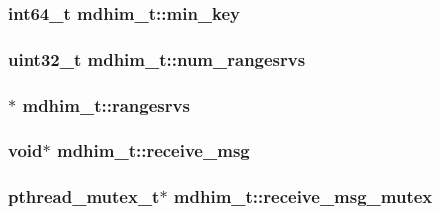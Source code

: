 \hypertarget{structmdhim__t_af005677e9912642ebe431f5037824d97}{
\subsubsection[{min\-\_\-key}]{\setlength{\rightskip}{0pt plus 5cm}int64\-\_\-t mdhim\-\_\-t\-::min\-\_\-key}}\label{d8/dbc/structmdhim__t_af005677e9912642ebe431f5037824d97}
\hypertarget{structmdhim__t_a41b224b41799585edf8a8b2b2f4626cc}{
\subsubsection[{num\-\_\-rangesrvs}]{\setlength{\rightskip}{0pt plus 5cm}uint32\-\_\-t mdhim\-\_\-t\-::num\-\_\-rangesrvs}}\label{d8/dbc/structmdhim__t_a41b224b41799585edf8a8b2b2f4626cc}
\hypertarget{structmdhim__t_ae05a450ac4f312ae4bdb9c1ea52e53e0}{
\subsubsection[{rangesrvs}]{$\ast$ mdhim\-\_\-t\-::rangesrvs}}\label{d8/dbc/structmdhim__t_ae05a450ac4f312ae4bdb9c1ea52e53e0}
\hypertarget{structmdhim__t_abc3233b7d61111d19bb7ac0222a918fc}{
\subsubsection[{receive\-\_\-msg}]{\setlength{\rightskip}{0pt plus 5cm}void$\ast$ mdhim\-\_\-t\-::receive\-\_\-msg}}\label{d8/dbc/structmdhim__t_abc3233b7d61111d19bb7ac0222a918fc}
\hypertarget{structmdhim__t_ae5abe6f33b5951a30f582fda42292706}{
\subsubsection[{receive\-\_\-msg\-\_\-mutex}]{\setlength{\rightskip}{0pt plus 5cm}pthread\-\_\-mutex\-\_\-t$\ast$ mdhim\-\_\-t\-::receive\-\_\-msg\-\_\-mutex}}\label{d8/dbc/structmdhim__t_ae5abe6f33b5951a30f582fda42292706}
